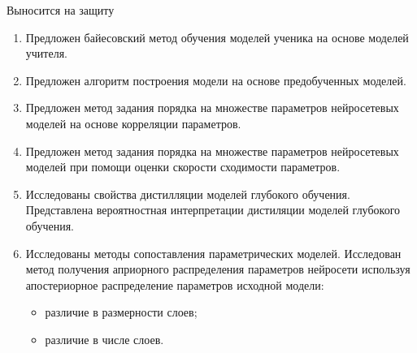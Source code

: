\documentclass[10pt,pdf,hyperref={unicode}]{beamer}
\begin{document}
\begin{frame}{Выносится на защиту}
\justifying
	\begin{enumerate}
	\justifying
	    \item Предложен байесовский метод обучения моделей ученика на основе моделей учителя.
        \item Предложен алгоритм построения модели на основе предобученных моделей.
        \item Предложен метод задания порядка на множестве параметров нейросетевых моделей на основе корреляции параметров.
        \item Предложен метод задания порядка на множестве параметров нейросетевых моделей при помощи оценки скорости сходимости параметров.
        \item Исследованы свойства дистилляции моделей глубокого обучения. Представлена вероятностная интерпретации дистиляции моделей глубокого обучения.
        \item Исследованы методы сопоставления параметрических моделей. Исследован метод получения априорного распределения параметров нейросети используя апостериорное распределение параметров исходной модели:
        \begin{itemize}
            \item различие в размерности слоев;
            \item различие в числе слоев.
        \end{itemize}
        
	\end{enumerate}

\end{frame}
\end{document}

